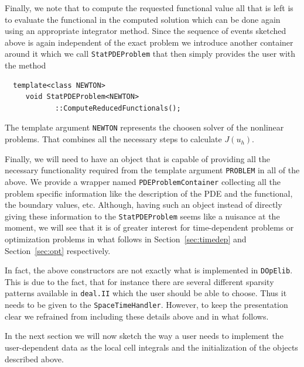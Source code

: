 \documentclass[smallextended]{svjour3}       %
\numberwithin{equation}{section}
\newcommand{\deal}{\texttt{deal.II}}
\newcommand{\dope}{\texttt{DOpElib}}
\begin{document}
Finally, we note that to compute the requested functional value 
all that is left is to evaluate the functional in the computed solution 
which can be done again using an appropriate integrator method.
Since the sequence of events sketched above is again independent of the 
exact problem we introduce another container around it which we call 
\texttt{StatPDEProblem} that then simply provides the user with the 
method
\begin{lstlisting}
  template<class NEWTON>
     void StatPDEProblem<NEWTON>
            ::ComputeReducedFunctionals();
\end{lstlisting}
The template argument \texttt{NEWTON} represents the choosen solver of the nonlinear problems.
That combines all the necessary steps to calculate $J(u_h)$. 

Finally, we will need to have an object that is capable of providing all 
the necessary functionality required from the template argument 
\texttt{PROBLEM} in all of the above. We provide a wrapper named
\texttt{PDEProblemContainer} collecting all the problem specific information 
like the description of the PDE and the functional, the boundary values, etc. 
Although, having such an object instead of directly giving these information
to the \texttt{StatPDEProblem} seems like a nuisance at the moment, we will 
see that it is of greater interest for time-dependent problems or 
optimization problems in what follows in Section~\ref{sec:timedep} and
Section~\ref{sec:opt} respectively. 

\begin{remark}
In fact, the above constructors are not exactly what is implemented in \dope{}.
This is due to the fact, that for instance 
there are several different sparsity patterns available in 
\deal{} which the user should be able to choose. Thus it needs to be 
given to the \texttt{SpaceTimeHandler}. However, to keep the 
presentation clear we refrained from including these details above and in
what follows.
\end{remark} 

In the next section we will now sketch the way a user needs to implement the
user-dependent data as the local cell integrals and the initialization of the
objects described above.
\end{document}
